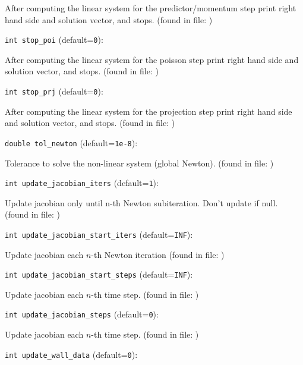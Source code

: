 After computing the linear system for the
 predictor/momentum step print right hand side
 and solution vector, and stops.
 (found in file: \verb++)
\item\verb+int stop_poi+ {\rm(default=\verb|0|)}:

After computing the linear system for the poisson step print
right hand side and solution vector, and stops. 
 (found in file: \verb++)
\item\verb+int stop_prj+ {\rm(default=\verb|0|)}:

After computing the linear system for the projection step print
right hand side and solution vector, and stops. 
 (found in file: \verb++)
\item\verb+double tol_newton+ {\rm(default=\verb|1e-8|)}:

Tolerance to solve the non-linear system (global Newton).
 (found in file: \verb++)
\item\verb+int update_jacobian_iters+ {\rm(default=\verb|1|)}:

Update jacobian only until n-th Newton subiteration. 
Don't update if null. 
 (found in file: \verb++)
\item\verb+int update_jacobian_start_iters+ {\rm(default=\verb|INF|)}:

Update jacobian each $n$-th Newton iteration
 (found in file: \verb++)
\item\verb+int update_jacobian_start_steps+ {\rm(default=\verb|INF|)}:

Update jacobian each $n$-th time step. 
 (found in file: \verb++)
\item\verb+int update_jacobian_steps+ {\rm(default=\verb|0|)}:

Update jacobian each $n$-th time step. 
 (found in file: \verb++)
\item\verb+int update_wall_data+ {\rm(default=\verb|0|)}:

